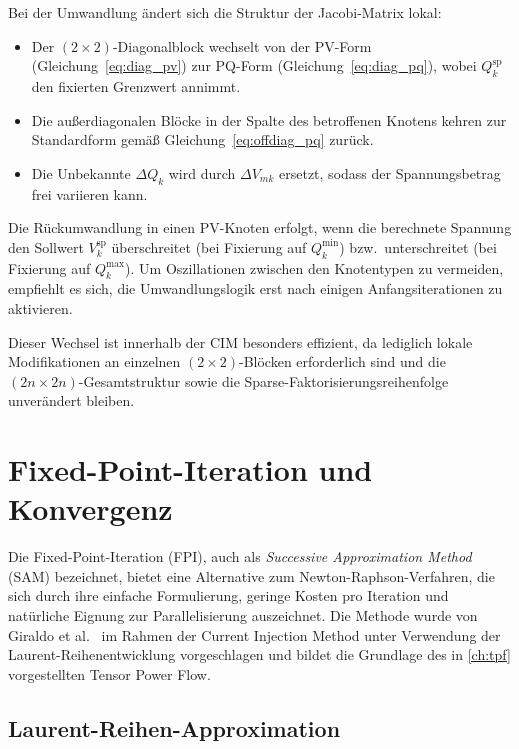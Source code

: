 Bei der Umwandlung ändert sich die Struktur der Jacobi-Matrix lokal:
\begin{itemize}
	\item Der $(2 \times 2)$-Diagonalblock wechselt von der PV-Form 
	(Gleichung~\eqref{eq:diag_pv}) zur PQ-Form (Gleichung~\eqref{eq:diag_pq}), 
	wobei $Q_k^{\mathrm{sp}}$ den fixierten Grenzwert annimmt.
	\item Die außerdiagonalen Blöcke in der Spalte des betroffenen Knotens kehren 
	zur Standardform gemäß Gleichung~\eqref{eq:offdiag_pq} zurück.
	\item Die Unbekannte $\Delta Q_k$ wird durch $\Delta V_{mk}$ ersetzt, sodass 
	der Spannungsbetrag frei variieren kann.
\end{itemize}

Die Rückumwandlung in einen PV-Knoten erfolgt, wenn die berechnete Spannung den 
Sollwert $V_k^{\mathrm{sp}}$ überschreitet (bei Fixierung auf $Q_k^{\min}$) bzw.\ 
unterschreitet (bei Fixierung auf $Q_k^{\max}$). Um Oszillationen zwischen den 
Knotentypen zu vermeiden, empfiehlt es sich, die Umwandlungslogik erst nach 
einigen Anfangsiterationen zu aktivieren.

Dieser Wechsel ist innerhalb der CIM besonders effizient, da lediglich lokale 
Modifikationen an einzelnen $(2 \times 2)$-Blöcken erforderlich sind und die 
$(2n \times 2n)$-Gesamtstruktur sowie die Sparse-Faktorisierungsreihenfolge 
unverändert bleiben.
\section{Fixed-Point-Iteration und Konvergenz}
\label{sec:fpi}

Die Fixed-Point-Iteration (FPI), auch als \textit{Successive Approximation Method} (SAM) bezeichnet, bietet eine Alternative zum Newton-Raphson-Verfahren, die sich durch ihre einfache Formulierung, geringe Kosten pro Iteration und natürliche Eignung zur Parallelisierung auszeichnet. Die Methode wurde von Giraldo et al.\ \cite{Giraldo2022} im Rahmen der Current Injection Method unter Verwendung der Laurent-Reihenentwicklung vorgeschlagen und bildet die Grundlage des in \cref{ch:tpf} vorgestellten Tensor Power Flow.

\subsection{Laurent-Reihen-Approximation}
\label{subsec:laurent}

